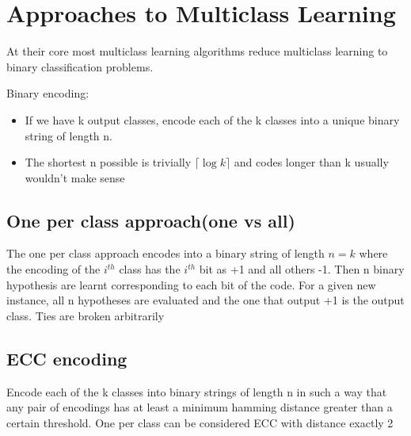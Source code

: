 \documentclass[11pt]{article}
\begin{document}
\section{Approaches to Multiclass Learning}
	At their core most multiclass learning algorithms reduce multiclass learning to binary classification problems.
	
	Binary encoding:
	\begin{itemize}
		\item If we have k output classes, encode each of the k classes into a unique binary string of length n.
		\item The shortest n possible is trivially $\lceil \log k \rceil$ and codes longer than k usually wouldn't make sense
	\end{itemize}
    \subsection{One per class approach(one vs all)}
        The one per class approach encodes into a binary string of length $n=k$ where the encoding of the $i^{th}$ class has the $i^{th}$ bit as +1 and all others -1. Then n binary hypothesis are learnt corresponding to each bit of the code. For a given new instance, all n hypotheses are evaluated and the one that output +1 is the output class. Ties are broken arbitrarily
    \subsection{ECC encoding}
        Encode each of the k classes into binary strings of length n in such a way that any pair of encodings has at least a minimum hamming distance greater than a certain threshold. One per class can be considered ECC with distance exactly 2
\end{document}
